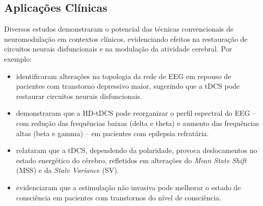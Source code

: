 \subsection{Aplicações Clínicas}
Diversos estudos demonstraram o potencial das técnicas convencionais de neuromodulação em contextos clínicos, evidenciando efeitos na restauração de circuitos neurais disfuncionais e na modulação da atividade cerebral. Por exemplo:
\begin{itemize}
    \item {} identificaram alterações na topologia da rede de EEG em repouso de pacientes com transtorno depressivo maior, sugerindo que a tDCS pode restaurar circuitos neurais disfuncionais.
    \item {} demonstraram que a HD‑tDCS pode reorganizar o perfil espectral do EEG – com redução das frequências baixas (delta e theta) e aumento das frequências altas (beta e gamma) – em pacientes com epilepsia refratária.
    \item {} relataram que a tDCS, dependendo da polaridade, provoca deslocamentos no estado energético do cérebro, refletidos em alterações do \textit{Mean State Shift} (MSS) e da \textit{State Variance} (SV).
    \item {} evidenciaram que a estimulação não invasiva pode melhorar o estado de consciência em pacientes com transtornos do nível de consciência.
\end{itemize}

